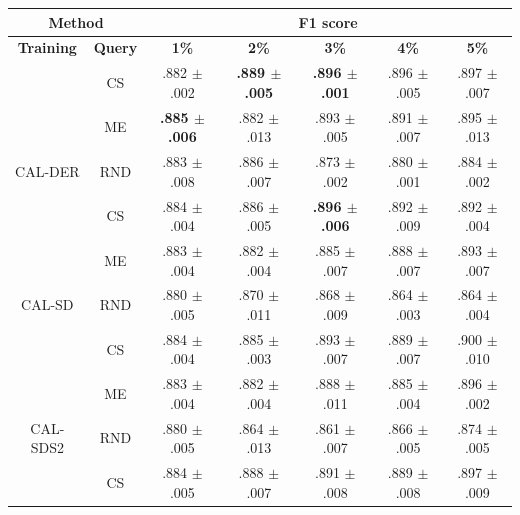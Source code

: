 \begin{table}[htbp]
\centering

\begin{tabular*}{\linewidth}{c|c|@{\extracolsep{\fill}}ccccc}
\toprule
\multicolumn{2}{c|}{\textbf{Method}} & \multicolumn{5}{c}{\textbf{F1 score}} \\
\midrule
\textbf{Training} & \textbf{Query} & \textbf{1\%} & \textbf{2\%} & \textbf{3\%} & \textbf{4\%} & \textbf{5\%}\\
\midrule
 & CS & .882 $\pm$ {\small .002} & \textbf{.889 $\pm$ {\small .005}} & \textbf{.896 $\pm$ {\small .001}} & .896 $\pm$ {\small .005} & .897 $\pm$ {\small .007}\\

 & ME & \textbf{.885 $\pm$ {\small .006}} & .882 $\pm$ {\small .013} & .893 $\pm$ {\small .005} & .891 $\pm$ {\small .007} & .895 $\pm$ {\small .013}\\

\multirow{-3}{*}{\raggedright\arraybackslash CAL-DER} & RND & .883 $\pm$ {\small .008} & .886 $\pm$ {\small .007} & .873 $\pm$ {\small .002} & .880 $\pm$ {\small .001} & .884 $\pm$ {\small .002}\\
\midrule
 & CS & .884 $\pm$ {\small .004} & .886 $\pm$ {\small .005} & \textbf{.896 $\pm$ {\small .006}} & .892 $\pm$ {\small .009} & .892 $\pm$ {\small .004}\\

 & ME & .883 $\pm$ {\small .004} & .882 $\pm$ {\small .004} & .885 $\pm$ {\small .007} & .888 $\pm$ {\small .007} & .893 $\pm$ {\small .007}\\

\multirow{-3}{*}{\raggedright\arraybackslash CAL-SD} & RND & .880 $\pm$ {\small .005} & .870 $\pm$ {\small .011} & .868 $\pm$ {\small .009} & .864 $\pm$ {\small .003} & .864 $\pm$ {\small .004}\\
\midrule
 & CS & .884 $\pm$ {\small .004} & .885 $\pm$ {\small .003} & .893 $\pm$ {\small .007} & .889 $\pm$ {\small .007} & .900 $\pm$ {\small .010}\\

 & ME & .883 $\pm$ {\small .004} & .882 $\pm$ {\small .004} & .888 $\pm$ {\small .011} & .885 $\pm$ {\small .004} & .896 $\pm$ {\small .002}\\

\multirow{-3}{*}{\raggedright\arraybackslash CAL-SDS2} & RND & .880 $\pm$ {\small .005} & .864 $\pm$ {\small .013} & .861 $\pm$ {\small .007} & .866 $\pm$ {\small .005} & .874 $\pm$ {\small .005}\\
\midrule
 & CS & .884 $\pm$ {\small .005} & .888 $\pm$ {\small .007} & .891 $\pm$ {\small .008} & .889 $\pm$ {\small .008} & .897 $\pm$ {\small .009}\\


\end{tabular*}
\end{table}
